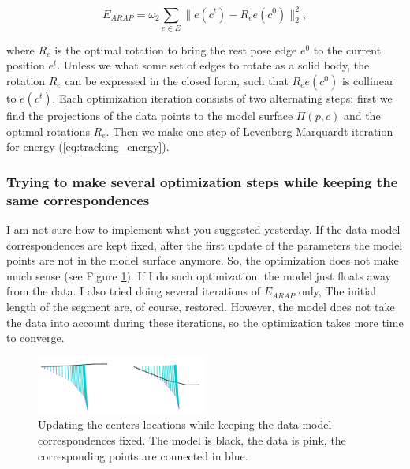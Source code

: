 \begin{equation}
	E_{ARAP} = \omega_2 \sum_{e \in E} \| e(c^t) - R_e e(c^0)\|_2^2,
\end{equation}

where $R_e$ is the optimal rotation to bring the rest pose edge $e^0$ to the current position $e^t$. Unless we what some set of edges to rotate as a solid body, the rotation $R_e$ can be expressed in the closed form, such that $R_e e(c^0)$ is collinear to $e(c^t)$. 
Each optimization iteration consists of two alternating steps: first we find the projections of the data points to the model surface $\Pi(p, c)$ and the optimal rotations $  R_e  $. Then we make one step of Levenberg-Marquardt iteration for energy (\ref{eq:tracking_energy}).

\subsubsection{Trying to make several optimization steps while keeping the same correspondences}

I am not sure how to implement what you suggested yesterday. If the data-model correspondences are kept fixed, after the first update of the parameters the model points are not in the model surface anymore. So, the optimization does not make much sense (see Figure \ref{fig:fixed_correspondences}). If I do such optimization, the model just floats away from the data.
I also tried doing several iterations of $E_{ARAP}$ only, The initial length of the segment are, of course, restored. However, the model does not take the data into account during these iterations, so the optimization takes more time to converge.

\begin{figure}[h!] 
	\centering
	\includegraphics[width=0.5\textwidth]{fig/fixed_correspondences}
	\caption{Updating the centers locations while keeping the data-model correspondences fixed. The model is black, the data is pink, the corresponding points are connected in blue.}
	\label{fig:fixed_correspondences}
\end{figure}